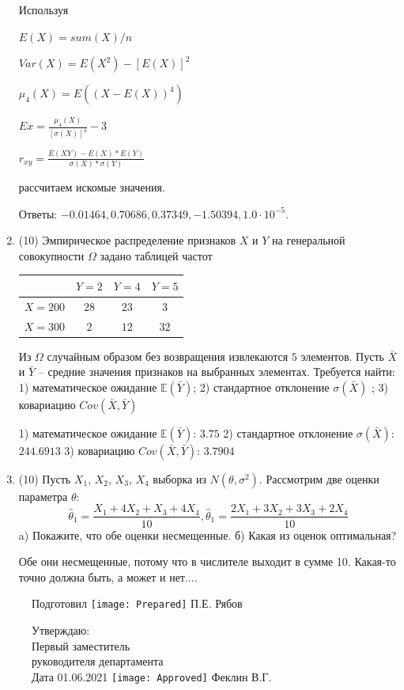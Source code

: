 \documentclass[a4paper,14pt]{article}
\begin{document}
\begin{enumerate}
    
    Используя

	$E(X) = sum(X) / n$

	$Var(X) = E(X^2) - [E(X)]^2$

	$\mu_4(X) = E((X-E(X))^4)$

	$Ex = \frac{\mu_4(X)}{[\sigma(X)]^4} - 3$

	$r_{xy} = \frac{E(XY) - E(X) * E(Y)}{\sigma(X) * \sigma(Y)}$

    рассчитаем искомые значения.

    Ответы: $-0.01464, 0.70686, 0.37349, -1.50394, 1.0 \cdot 10^{-5}$.

    

\item


(10) Эмпирическое распределение признаков $X$ и $Y$ на генеральной совокупности $\Omega$ задано таблицей частот  
 
\begin{tabular}{ | c | c | c | c | }
\hline
 & $Y = 2$ & $Y = 4$ & $Y = 5$  \\ \hline
$X = 200$ & $28$ & $23$ & $3$\\ \hline
$X = 300$ & $2$ & $12$ & $32$\\
\hline
\end{tabular}

Из $\Omega$ случайным образом без возвращения извлекаются $5$ элементов. 
Пусть $\bar X$ и $\bar Y$ – средние значения признаков на выбранных элементах. 
Требуется найти: 1) математическое ожидание $\mathbb{E}(\bar Y)$; 2) стандартное отклонение $\sigma(\bar X)$ ; 
3) ковариацию $Cov(\bar X, \bar Y)$




1) математическое ожидание $\mathbb{E}(\bar Y)$: $3.75$ 
2) стандартное отклонение $\sigma(\bar X)$: $244.6913$
3) ковариацию $Cov(\bar X, \bar Y)$: $3.7904$


\item


(10) Пусть $X _{1}$, $X _{2}$, $X _{3}$, $X _{4}$ выборка из $N(\theta, \sigma ^{2})$. Рассмотрим две оценки параметра $\theta$:
\[\hat \theta _{1} = \frac{X _{1} + 4X _{2} + X _{3} + 4X _{4}}{10}, \hat \theta _{1} = \frac{2X _{1} + 3X _{2} + 3X _{3} + 2X _{4}}{10}\]
a) Покажите, что обе оценки несмещенные.
б) Какая из оценок оптимальная?




Обе они несмещенные, потому что в числителе выходит в сумме 10.
Какая-то точно должна быть, а может и нет....


\end{enumerate}

\begin{figure}[H]
	Подготовил
	\hfill
	\texttt{[image: Prepared]}
	П.Е. Рябов
\end{figure}


\begin{figure}[H]
	Утверждаю:\\
	Первый заместитель\\
	руководителя департамента\\
	Дата 01.06.2021
	\hfill
	\texttt{[image: Approved]}
	Феклин В.Г.
\end{figure}
\end{document}
